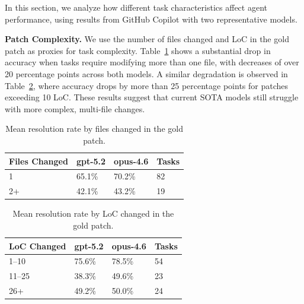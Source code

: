 \documentclass{article}
\begin{document}
In this section, we analyze how different task characteristics affect agent performance, using results from GitHub Copilot with two representative models.

\textbf{Patch Complexity.} We use the number of files changed and LoC in the gold patch as proxies for task complexity. Table~\ref{tab:resolution_by_files} shows a substantial drop in accuracy when tasks require modifying more than one file, with decreases of over 20 percentage points across both models. A similar degradation is observed in Table~\ref{tab:resolution_by_loc}, where accuracy drops by more than 25 percentage points for patches exceeding 10 LoC. These results suggest that current SOTA models still struggle with more complex, multi-file changes.

\begin{table}[t]
\vskip 0.05in
\begin{center}
\begin{small}
\begin{sc}
\begin{tabular}{llll}
\toprule
\textbf{Files Changed} & \textbf{gpt-5.2} & \textbf{opus-4.6} & \textbf{Tasks} \\
\midrule
1  & 65.1\% & 70.2\% & 82 \\
2+ & 42.1\% & 43.2\% & 19 \\
\bottomrule
\end{tabular}
\end{sc}
\end{small}
\end{center}
\caption{Mean resolution rate by files changed in the gold patch.}
\label{tab:resolution_by_files}
\vskip 0.1in
\end{table}

\begin{table}[t]
\vskip 0.05in
\begin{center}
\begin{small}
\begin{sc}
\begin{tabular}{llll}
\toprule
\textbf{LoC Changed} & \textbf{gpt-5.2} & \textbf{opus-4.6} & \textbf{Tasks} \\
\midrule
1--10  & 75.6\% & 78.5\% & 54 \\
11--25 & 38.3\% & 49.6\% & 23 \\
26+    & 49.2\% & 50.0\% & 24 \\
\bottomrule
\end{tabular}
\end{sc}
\end{small}
\end{center}
\caption{Mean resolution rate by LoC changed in the gold patch.}
\label{tab:resolution_by_loc}
\vskip 0.1in
\end{table}
\end{document}
